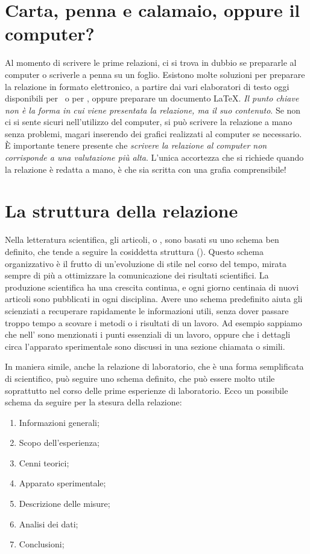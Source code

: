 \section{Carta, penna e calamaio, oppure il computer?}

Al momento di scrivere le prime relazioni, ci si trova in dubbio se prepararle
al computer o scriverle a penna su un foglio. Esistono molte soluzioni per
preparare la relazione in formato elettronico, a partire dai vari elaboratori
di testo oggi disponibili per \linux\ o per \windows, oppure preparare un
documento \LaTeX. \emph{Il punto chiave non è la forma in cui viene presentata
  la relazione, ma il suo contenuto}. Se non ci si sente sicuri nell'utilizzo
del computer, si può scrivere la relazione a mano senza problemi, magari
inserendo dei grafici realizzati al computer se necessario. \`E importante
tenere presente che \emph{scrivere la relazione al computer non corrisponde a
  una valutazione più alta}. L'unica accortezza che si richiede quando la
relazione è redatta a mano, è che sia scritta con una grafia comprensibile!


\section{La struttura della relazione}
\label{sec:relazione_struttura}

Nella letteratura scientifica, gli articoli, o , sono basati su uno
schema ben definito, che tende a seguire la cosiddetta struttura 
(). Questo schema
organizzativo è il frutto di un'evoluzione di stile nel corso del tempo,
mirata sempre di più a ottimizzare la comunicazione dei risultati scientifici.
La produzione scientifica ha una crescita continua, e ogni giorno centinaia di
nuovi articoli sono pubblicati in ogni disciplina. Avere uno schema predefinito
aiuta gli scienziati a recuperare rapidamente le informazioni utili, senza
dover passare troppo tempo a scovare i metodi o i risultati di un lavoro. Ad
esempio sappiamo che nell' sono menzionati i punti essenziali di
un lavoro, oppure che i dettagli circa l'apparato sperimentale sono discussi
in una sezione chiamata  o simili.

In maniera simile, anche la relazione di laboratorio, che è una forma
semplificata di  scientifico, può seguire uno schema definito,
che può essere molto utile soprattutto nel corso delle prime esperienze di
laboratorio. Ecco un possibile schema da seguire per la stesura della relazione:
\begin{enumerate}
\item Informazioni generali;
\item Scopo dell'esperienza;
\item Cenni teorici;
\item Apparato sperimentale;
\item Descrizione delle misure;
\item Analisi dei dati;
\item Conclusioni;
\end{enumerate}


